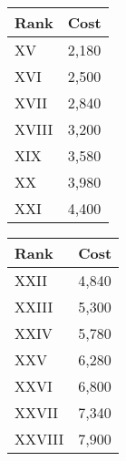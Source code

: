 \begin{minipage}{0.25\textwidth}
    \begin{tabular}{l | l}
        Rank & Cost\\ \hline
        XV & 2,180\\
        XVI & 2,500\\
        XVII & 2,840\\
        XVIII & 3,200\\
        XIX & 3,580\\
        XX & 3,980\\
        XXI & 4,400\\
    \end{tabular}
\end{minipage}
\begin{minipage}{0.25\textwidth}
    \begin{tabular}{l | l}
        Rank & Cost\\ \hline
        XXII & 4,840\\
        XXIII & 5,300\\
        XXIV & 5,780\\
        XXV & 6,280\\
        XXVI & 6,800\\
        XXVII & 7,340\\
        XXVIII & 7,900\\
    \end{tabular}
\end{minipage}

























